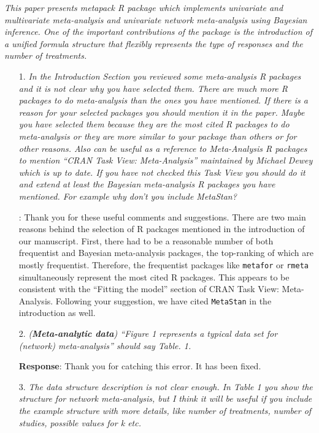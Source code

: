 \documentclass[11pt]{article}
\newcommand{\1}{{\bf{{1}}}}
\begin{document}
{\it This paper presents metapack R package which implements univariate and multivariate meta-analysis and univariate network meta-analysis using Bayesian
inference. One of the important contributions of the package is the introduction of a unified formula structure that flexibly represents the type of responses and
the number of treatments.}

\begin{itemize}
    \item[1.] {\it In the Introduction Section you reviewed some meta-analysis R packages and it is not clear why you have selected them.
    There are much more R packages to do meta-analysis than the ones you have mentioned. If there is a reason for your selected packages you should mention it in the paper. Maybe you have selected them because they are the most cited R packages to do meta-analysis or they are more similar to your package than others or for other reasons. Also can be useful as a reference to Meta-Analysis R packages to mention ``CRAN Task View: Meta-Analysis'' maintained by Michael Dewey which is up to date. If you have not checked this Task View you should do it and extend at least the Bayesian meta-analysis R packages you have mentioned. For example why don't you include MetaStan?}

\medskip
{}: Thank you for these useful comments and suggestions.
 There are two main reasons behind the selection of R packages mentioned in the
introduction of our manuscript. First, there had to be a reasonable number of both frequentist and Bayesian meta-analysis packages, the top-ranking of which are
mostly frequentist. Therefore, the frequentist packages like \texttt{metafor} or \texttt{rmeta} simultaneously represent the most cited R packages. This appears to
be consistent with the ``Fitting the model'' section of CRAN Task View: Meta-Analysis. Following your suggestion, we have cited \texttt{MetaStan} in the
introduction as well.


\item[2.] {\it (\textbf{Meta-analytic data}) ``Figure 1 represents a typical data set for (network) meta-analysis'' should say Table. 1.}

\medskip
\noindent
{\bf Response}: Thank you for catching this error. It has been fixed.

\item[3.] {\it The data structure description is not clear enough. In Table 1 you show the structure for network meta-analysis, but I think it will be useful if you include the example structure with more details, like number of treatments, number of studies, possible values for k etc.}


\end{itemize}
\end{document}
